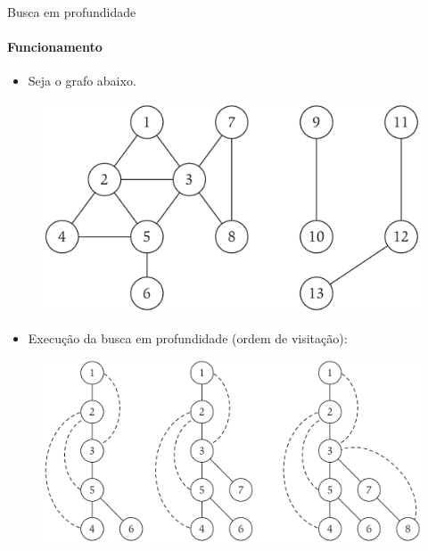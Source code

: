 \begin{frame}{Busca em profundidade}
	\framesubtitle{Funcionamento}

	\begin{itemize}
		\item Seja o grafo abaixo.
	\end{itemize}
	
	\vspace{-9pt}
	
	\begin{figure}
		\centering
		\includegraphics[width=0.2\linewidth,trim={0 0 15cm 0},clip]{img/conectividade}
	\end{figure}
	
	\vspace{-8pt}
	
	\begin{itemize}
		\item Execução da busca em profundidade (ordem de visitação):
	\end{itemize}
	
	\vspace{-4pt}
	
	\begin{figure}
		\centering
		\includegraphics[width=0.65\linewidth,trim={0 0 0 0},clip]{img/busca-profundidade}
	\end{figure}
\end{frame}



